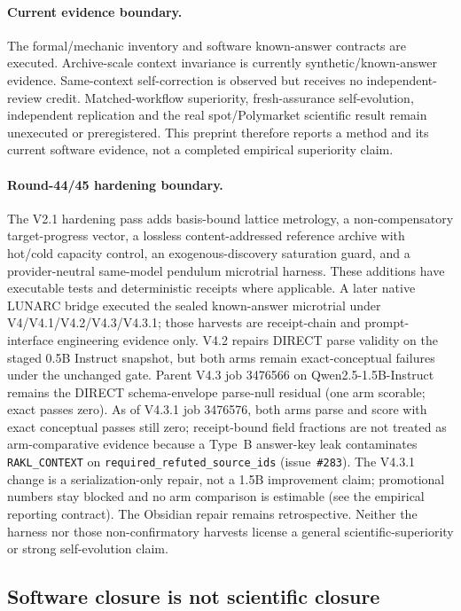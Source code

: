 \paragraph{Current evidence boundary.} The formal/mechanic inventory and software known-answer contracts are executed. Archive-scale context invariance is currently synthetic/known-answer evidence. Same-context self-correction is observed but receives no independent-review credit. Matched-workflow superiority, fresh-assurance self-evolution, independent replication and the real spot/Polymarket scientific result remain unexecuted or preregistered. This preprint therefore reports a method and its current software evidence, not a completed empirical superiority claim.


\paragraph{Round-44/45 hardening boundary.}
The V2.1 hardening pass adds basis-bound lattice metrology, a non-compensatory target-progress vector, a lossless content-addressed reference archive with hot/cold capacity control, an exogenous-discovery saturation guard, and a provider-neutral same-model pendulum microtrial harness. These additions have executable tests and deterministic receipts where applicable. A later native LUNARC bridge executed the sealed known-answer microtrial under V4/V4.1/V4.2/V4.3/V4.3.1; those harvests are receipt-chain and prompt-interface engineering evidence only. V4.2 repairs DIRECT parse validity on the staged 0.5B Instruct snapshot, but both arms remain exact-conceptual failures under the unchanged gate. Parent V4.3 job 3476566 on Qwen2.5-1.5B-Instruct remains the DIRECT schema-envelope parse-null residual (one arm scorable; exact passes zero). As of V4.3.1 job 3476576, both arms parse and score with exact conceptual passes still zero; receipt-bound field fractions are not treated as arm-comparative evidence because a Type~B answer-key leak contaminates \texttt{RAKL\_CONTEXT} on \texttt{required\_refuted\_source\_ids} (issue~\texttt{\#283}). The V4.3.1 change is a serialization-only repair, not a 1.5B improvement claim; promotional numbers stay blocked and no arm comparison is estimable (see the empirical reporting contract). The Obsidian repair remains retrospective. Neither the harness nor those non-confirmatory harvests license a general scientific-superiority or strong self-evolution claim.

\subsection{Software closure is not scientific closure}

